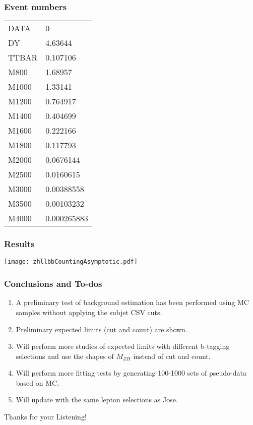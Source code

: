 \documentclass[aspectratio=169]{beamer}
\begin{document}
\begin{frame}
  \frametitle{Event numbers}
  \justifying
  \begin{tiny}
    \begin{center}
      \begin{tabular}{ | l | l | }
        \hline
        DATA  & 0           \\
        DY    & 4.63644     \\
        TTBAR & 0.107106    \\
        M800  & 1.68957     \\
        M1000 & 1.33141     \\
        M1200 & 0.764917    \\
        M1400 & 0.404699    \\
        M1600 & 0.222166    \\
        M1800 & 0.117793    \\
        M2000 & 0.0676144   \\
        M2500 & 0.0160615   \\
        M3000 & 0.00388558  \\
        M3500 & 0.00103232  \\
        M4000 & 0.000265883 \\
        \hline
      \end{tabular}
    \end{center}
  \end{tiny}
\end{frame}
\begin{frame}
  \frametitle{Results}
  \begin{center}
    \texttt{[image: zhllbbCountingAsymptotic.pdf]}
  \end{center}
\end{frame}
\begin{frame}
  \frametitle{Conclusions and To-dos}
  \justifying 
  \begin{footnotesize}
    \begin{enumerate}[1.]
      \setcounter{enumi}{0} %
    \item A preliminary test of background estimation has been performed using MC samples without applying the subjet CSV cuts.
    \item Preliminary expected limits (cut and count) are shown. 
    \item Will perform more studies of expected limits with different b-tagging selections and use the shapes of $M_{ZH}$ instead of cut and count.
    \item Will perform more fitting tests by generating 100-1000 sets of pseudo-data based on MC.
    \item Will update with the same lepton selections as Jose.
    \end{enumerate}
  \end{footnotesize}
\end{frame}
\begin{frame}
  \Huge{\centerline{Thanks for your Listening!}}
\end{frame}
\end{document}
